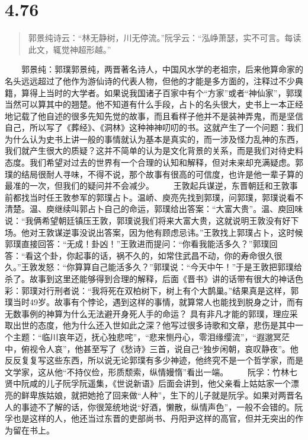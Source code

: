 \documentclass[]{book}
\begin{document}
\section{4.76}\label{section-253}

\begin{quote}
郭景纯诗云：``林无静树，川无停流。''阮孚云：``泓峥萧瑟，实不可言。每读此文，辄觉神超形越。''
\end{quote}

　　郭景纯：郭璞郭景纯，两晋著名诗人，中国风水学的老祖宗，后来他算命家的名头远远超过了他作为游仙诗的代表人物，但他的才能是多方面的，注释过不少典籍，算得上当时的大学者。如果说我国诸子百家中有个``方家''或者``神仙家''，郭璞当然可以算其中的翘楚。他不知道有什么手段，占卜的名头很大，史书上一本正经地记载了他自述的很多先知先觉的故事，而且看样子他并不是装神弄鬼，而是坚信自己，所以写了《葬经》、《洞林》这种神神叨叨的书。这就产生了一个问题：我们为什么认为史书上讲一般的事情就认为基本是真实的，而一涉及怪力乱神的东西，我们就产生很大的质疑？这并不简单的认为是文化背景的关系，而是我们对待史料态度。我们希望对过去的世界有一个合理的认知和解释，但对未来却充满疑虑。郭璞的结局很耐人寻味，不得不说，那个故事有很高的可信度，也许是他一辈子算的最准的一次，但我们的疑问并不会减少。
　　王敦起兵谋逆，东晋朝廷和王敦事前都找当时任王敦参军的郭璞占卜。温峤、庾亮先找到郭璞，问郭璞，郭璞说看不清楚。温、庾继续叫郭占卜自己的命运，郭璞给出答案：``大富大贵''。温、庾回味说：``我俩希望朝廷镇压王敦，郭璞说我们将来大富大贵，这就说明王敦没有好下场。他对王敦谋逆事没说出答案，因为他有顾虑忌讳。''王敦找上郭璞占卜，这时候郭璞直接回答：``无成！卦凶！''王敦进而提问：``你看我能活多久？''郭璞回答：``看这个卦，你起事的话，祸不久的，如常住武昌不动，你的寿命很久很久。''王敦发怒：``你算算自己能活多久？''郭璞说：``今天中午！''于是王敦把郭璞给杀了。故事到这里还能够得到合理的解释，后面《晋书》讲的话带有很大的神话色彩：郭璞对行刑者说：``我将死在双柏树下，树上有个大鹊巢。''结果真是这样，郭璞当时49岁。故事有个悖论，遇到这样的事情，就算常人也能找到脱身之计，而有无数事例的神算为什么无法避开身死人手的命运？
具有非凡才能的郭璞，理应采取出世的态度，他为什么还入世如此之深？他写过很多诗歌和文章，悲伤是其中一个主题：``临川哀年迈，抚心独悲咤''，``悲来恻丹心，零泪缘缨流''，``遐邈冥茫中，俯视令人哀''，他甚至写了《愁诗》三首，说自己``独步闲朝，哀叹静夜''。他反反复复写这些东西，所以说无论郭璞有多少神迹，他终究不是一个哲学家，而是文学家，这从他``不持仪俭，形质颓索，纵情嫚惰''看出一端。
　　阮孚：竹林七贤中阮咸的儿子阮孚阮遥集，《世说新语》后面会讲到，他父亲看上姑姑家一个漂亮的鲜卑族姑娘，就把她抢了回来做``人种''，生下的儿子就是阮孚。如果对两晋名人的事迹不了解的话，你很笼统地说``好酒，懒散，纵情声色''，一般不会错的。阮孚也是这样的人，他还当过东晋的吏部尚书、丹阳尹这样的高官，但并无突出的作为留在书上。
\end{document}
